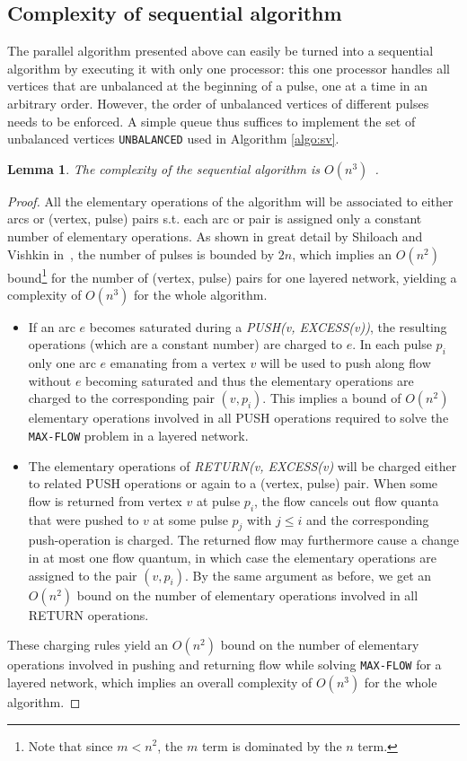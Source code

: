 \documentclass[a4paper,10pt, twocolumn]{article}
\newtheorem{lemma}{Lemma}
\begin{document}
\subsection{Complexity of sequential algorithm}
\label{sec:sv_seq}
The parallel algorithm presented above can easily be turned into a sequential algorithm by executing it with only one processor: this one processor handles all vertices that are unbalanced at the beginning of a pulse, one at a time in an arbitrary order. However, the order of unbalanced vertices of different pulses needs to be enforced. A simple queue thus suffices to implement the set of unbalanced vertices \lstinline|UNBALANCED| used in Algorithm \ref{algo:sv}.

\begin{lemma}
The complexity of the sequential algorithm is $O(n^{3})$~\cite{yossi81}.
\end{lemma}
\begin{proof}
All the elementary operations of the algorithm will be associated to either arcs or (vertex, pulse) pairs s.t. each arc or pair is assigned only a constant number of elementary operations. As shown in great detail by Shiloach and Vishkin in~\cite{yossi81}, the number of pulses is bounded by $2n$, which implies an $O(n^{2})$  bound\footnote{Note that since $m < n^2$, the $m$ term is dominated by the $n$ term.} for the number of (vertex, pulse) pairs for one layered network, yielding a complexity of $O(n^{3})$ for the whole algorithm.

\begin{itemize}
	\item If an arc $e$ becomes saturated during a \emph{PUSH(v, EXCESS(v))}, the resulting operations (which are a constant number) are charged to $e$. In each pulse $p_i$ only one arc $e$ emanating from a vertex $v$ will be used to push along flow without $e$ becoming saturated and thus the elementary operations are charged to the corresponding pair $(v, p_i)$. This implies a bound of $O(n^2)$ elementary operations involved in all PUSH operations required to solve the \lstinline|MAX-FLOW| problem in a layered network.
	\item The elementary operations of \emph{RETURN(v, EXCESS(v)} will be charged either to related PUSH operations or again to a (vertex, pulse) pair. When some flow is returned from vertex $v$ at pulse $p_i$, the flow cancels out flow quanta that were pushed to $v$ at some pulse $p_j$ with $j \leq i$ and the corresponding push-operation is charged. The returned flow may furthermore cause a change in at most one flow quantum, in which case the elementary operations are assigned to the pair $(v, p_i)$. By the same argument as before, we get an $O(n^{2})$ bound on the number of elementary operations involved in all RETURN operations.
\end{itemize}

These charging rules yield an $O(n^{2})$ bound on the number of elementary operations involved in pushing and returning flow while solving \lstinline|MAX-FLOW| for a layered network, which implies an overall complexity of $O(n^{3})$ for the whole algorithm. 
\end{proof}
\end{document}
